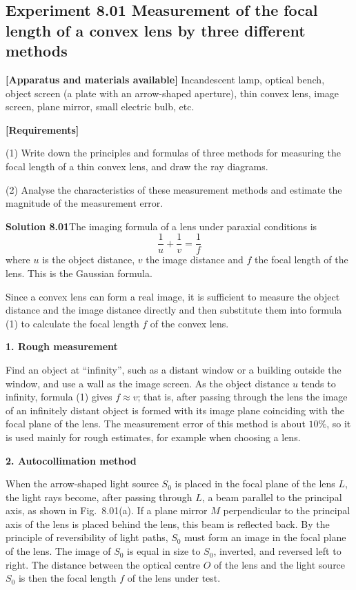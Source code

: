 \subsection*{Experiment 8.01 \quad Measurement of the focal length of a convex lens by three different methods}

\textbf{[Apparatus and materials available]} Incandescent lamp, optical bench, object screen (a plate with an arrow-shaped aperture), thin convex lens, image screen, plane mirror, small electric bulb, etc.

\textbf{[Requirements]}

(1) Write down the principles and formulas of three methods for measuring the focal length of a thin convex lens, and draw the ray diagrams.

(2) Analyse the characteristics of these measurement methods and estimate the magnitude of the measurement error.

\textbf{Solution 8.01}\quad The imaging formula of a lens under paraxial conditions is
\begin{equation}
\frac{1}{u}+\frac{1}{v}=\frac{1}{f} \tag{1}
\end{equation}
where $u$ is the object distance, $v$ the image distance and $f$ the focal length of the lens. This is the Gaussian formula.

Since a convex lens can form a real image, it is sufficient to measure the object distance and the image distance directly and then substitute them into formula (1) to calculate the focal length $f$ of the convex lens.

\textbf{1. Rough measurement}

Find an object at ``infinity'', such as a distant window or a building outside the window, and use a wall as the image screen. As the object distance $u$ tends to infinity, formula (1) gives $f\approx v$; that is, after passing through the lens the image of an infinitely distant object is formed with its image plane coinciding with the focal plane of the lens. The measurement error of this method is about $10\%$, so it is used mainly for rough estimates, for example when choosing a lens.

\textbf{2. Autocollimation method}

When the arrow-shaped light source $S_0$ is placed in the focal plane of the lens $L$, the light rays become, after passing through $L$, a beam parallel to the principal axis, as shown in Fig.~8.01(a). If a plane mirror $M$ perpendicular to the principal axis of the lens is placed behind the lens, this beam is reflected back. By the principle of reversibility of light paths, $S_0$ must form an image in the focal plane of the lens. The image of $S_0$ is equal in size to $S_0$, inverted, and reversed left to right. The distance between the optical centre $O$ of the lens and the light source $S_0$ is then the focal length $f$ of the lens under test.

